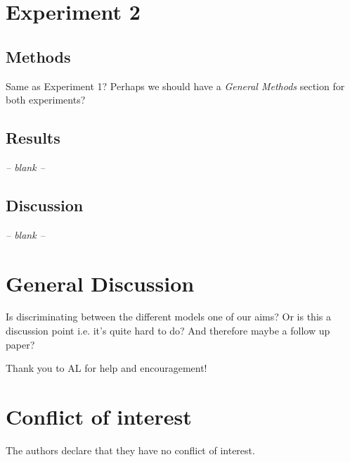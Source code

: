 \documentclass[smallextended]{svjour3}       %
\begin{document}
\section{Experiment 2}

\subsection{Methods}

Same as Experiment 1? Perhaps we should have a \textit{General Methods} section for both experiments?

\subsection{Results}
\begin{center}
\textit{-- blank --}
\end{center}

\subsection{Discussion}
\begin{center}
\textit{-- blank --}
\end{center}

\section{General Discussion}

Is discriminating between the different models one of our aims? Or is this a discussion point i.e. it's quite hard to do? And therefore maybe a follow up paper?


\begin{acknowledgements}
Thank you to AL for help and encouragement! 
\end{acknowledgements}

%
\section*{Conflict of interest}
The authors declare that they have no conflict of interest.

\end{document}
